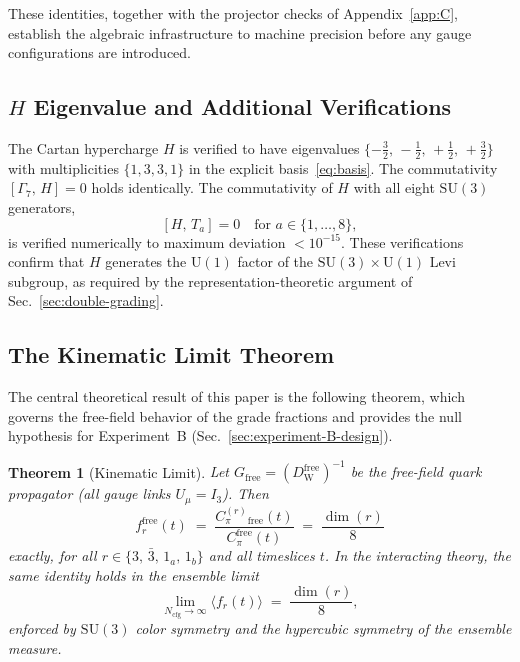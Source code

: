\documentclass[12pt]{article}
\newtheorem{theorem}{Theorem}[section]
\theoremstyle{definition}
\theoremstyle{remark}
\newcommand{\su}{\mathrm{SU}}           %
\newcommand{\dW}{D_{\mathrm{W}}}        %
\newcommand{\GaSeven}{\Gamma_7}                      %
\newcommand{\Ncfg}{N_{\mathrm{cfg}}}                  %
\begin{document}
	These identities, together with the projector checks of
	Appendix~\ref{app:C}, establish the algebraic infrastructure to machine
	precision before any gauge configurations are introduced.
	
	\subsection{\texorpdfstring{$H$}{H} Eigenvalue and Additional Verifications}
	\label{sec:H-eigenvalue-verif}
	
	The Cartan hypercharge $H$ is verified to have eigenvalues
	$\{-\tfrac{3}{2},\,-\tfrac{1}{2},\,+\tfrac{1}{2},\,+\tfrac{3}{2}\}$ with
	multiplicities $\{1,3,3,1\}$ in the explicit basis~\eqref{eq:basis}.
	The commutativity $[\GaSeven,\,H]=0$ holds identically.  The commutativity
	of $H$ with all eight $\su(3)$ generators,
	\[
	[H,\,T_a] = 0
	\quad\text{for } a\in\{1,\ldots,8\},
	\]
	is verified numerically to maximum deviation $<10^{-15}$.  These
	verifications confirm that $H$ generates the $\mathrm{U}(1)$ factor of the
	$\su(3)\times\mathrm{U}(1)$ Levi subgroup, as required by the
	representation-theoretic argument of Sec.~\ref{sec:double-grading}.
	
	
	\subsection{The Kinematic Limit Theorem}
	\label{sec:kinematic-theorem}
	
	The central theoretical result of this paper is the following theorem,
	which governs the free-field behavior of the grade fractions and provides
	the null hypothesis for Experiment~B (Sec.~\ref{sec:experiment-B-design}).
	
	\begin{theorem}[Kinematic Limit]
		\label{thm:kinematic}
		Let $G_{\mathrm{free}} = (\dW^{\mathrm{free}})^{-1}$ be the free-field
		quark propagator (all gauge links $U_\mu = I_3$).  Then
		\begin{equation}
			f_r^{\mathrm{free}}(t)
			\;=\; \frac{C_\pi^{(r)}{}_{\!\mathrm{free}}(t)}{C_\pi^{\mathrm{free}}(t)}
			\;=\; \frac{\dim(r)}{8}
			\label{eq:kinematic-free}
		\end{equation}
		exactly, for all $r\in\{3,\,\bar{3},\,1_a,\,1_b\}$ and all timeslices $t$.
		In the interacting theory, the same identity holds in the ensemble limit
		\begin{equation}
			\lim_{\Ncfg\to\infty}\langle f_r(t)\rangle \;=\; \frac{\dim(r)}{8},
			\label{eq:kinematic-interacting}
		\end{equation}
		enforced by $\su(3)$ color symmetry and the hypercubic symmetry of the
		ensemble measure.
	\end{theorem}
	
\end{document}
